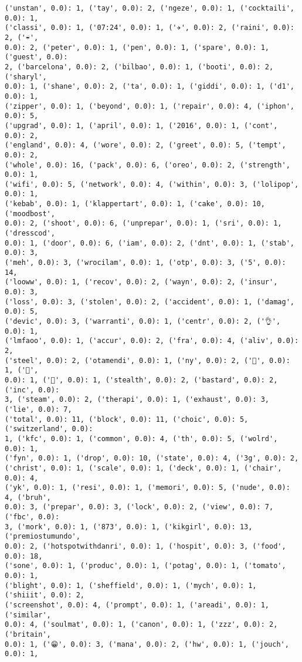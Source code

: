 \documentclass[11pt]{article}
\begin{document}
\begin{Verbatim}[commandchars=\\\{\}]
('unstan', 0.0): 1, ('tay', 0.0): 2, ('ngeze', 0.0): 1, ('cocktaili', 0.0): 1,
('classi', 0.0): 1, ('07:24', 0.0): 1, ('✈', 0.0): 2, ('raini', 0.0): 2, ('☔',
0.0): 2, ('peter', 0.0): 1, ('pen', 0.0): 1, ('spare', 0.0): 1, ('guest', 0.0):
2, ('barcelona', 0.0): 2, ('bilbao', 0.0): 1, ('booti', 0.0): 2, ('sharyl',
0.0): 1, ('shane', 0.0): 2, ('ta', 0.0): 1, ('giddi', 0.0): 1, ('d1', 0.0): 1,
('zipper', 0.0): 1, ('beyond', 0.0): 1, ('repair', 0.0): 4, ('iphon', 0.0): 5,
('upgrad', 0.0): 1, ('april', 0.0): 1, ('2016', 0.0): 1, ('cont', 0.0): 2,
('england', 0.0): 4, ('wore', 0.0): 2, ('greet', 0.0): 5, ('tempt', 0.0): 2,
('whole', 0.0): 16, ('pack', 0.0): 6, ('oreo', 0.0): 2, ('strength', 0.0): 1,
('wifi', 0.0): 5, ('network', 0.0): 4, ('within', 0.0): 3, ('lolipop', 0.0): 1,
('kebab', 0.0): 1, ('klappertart', 0.0): 1, ('cake', 0.0): 10, ('moodbost',
0.0): 2, ('shoot', 0.0): 6, ('unprepar', 0.0): 1, ('sri', 0.0): 1, ('dresscod',
0.0): 1, ('door', 0.0): 6, ('iam', 0.0): 2, ('dnt', 0.0): 1, ('stab', 0.0): 3,
('meh', 0.0): 3, ('wrocilam', 0.0): 1, ('otp', 0.0): 3, ('5', 0.0): 14,
('looww', 0.0): 1, ('recov', 0.0): 2, ('wayn', 0.0): 2, ('insur', 0.0): 3,
('loss', 0.0): 3, ('stolen', 0.0): 2, ('accident', 0.0): 1, ('damag', 0.0): 5,
('devic', 0.0): 3, ('warranti', 0.0): 1, ('centr', 0.0): 2, ('👌', 0.0): 1,
('lmfaoo', 0.0): 1, ('accur', 0.0): 2, ('fra', 0.0): 4, ('aliv', 0.0): 2,
('steel', 0.0): 2, ('otamendi', 0.0): 1, ('ny', 0.0): 2, ('🚖', 0.0): 1, ('🗽',
0.0): 1, ('🌃', 0.0): 1, ('stealth', 0.0): 2, ('bastard', 0.0): 2, ('inc', 0.0):
3, ('steam', 0.0): 2, ('therapi', 0.0): 1, ('exhaust', 0.0): 3, ('lie', 0.0): 7,
('total', 0.0): 11, ('block', 0.0): 11, ('choic', 0.0): 5, ('switzerland', 0.0):
1, ('kfc', 0.0): 1, ('common', 0.0): 4, ('th', 0.0): 5, ('wolrd', 0.0): 1,
('fyn', 0.0): 1, ('drop', 0.0): 10, ('state', 0.0): 4, ('3g', 0.0): 2,
('christ', 0.0): 1, ('scale', 0.0): 1, ('deck', 0.0): 1, ('chair', 0.0): 4,
('yk', 0.0): 1, ('resi', 0.0): 1, ('memori', 0.0): 5, ('nude', 0.0): 4, ('bruh',
0.0): 3, ('prepar', 0.0): 3, ('lock', 0.0): 2, ('view', 0.0): 7, ('fbc', 0.0):
3, ('mork', 0.0): 1, ('873', 0.0): 1, ('kikgirl', 0.0): 13, ('premiostumundo',
0.0): 2, ('hotspotwithdanri', 0.0): 1, ('hospit', 0.0): 3, ('food', 0.0): 18,
('sone', 0.0): 1, ('produc', 0.0): 1, ('potag', 0.0): 1, ('tomato', 0.0): 1,
('blight', 0.0): 1, ('sheffield', 0.0): 1, ('mych', 0.0): 1, ('shiiit', 0.0): 2,
('screenshot', 0.0): 4, ('prompt', 0.0): 1, ('areadi', 0.0): 1, ('similar',
0.0): 4, ('soulmat', 0.0): 1, ('canon', 0.0): 1, ('zzz', 0.0): 2, ('britain',
0.0): 1, ('😁', 0.0): 3, ('mana', 0.0): 2, ('hw', 0.0): 1, ('jouch', 0.0): 1,

\end{Verbatim}
\end{document}
